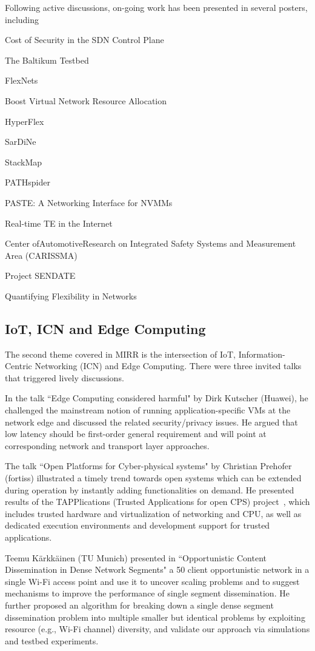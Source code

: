 
Following active discussions, on-going work has been presented in 
several posters, including 

Cost of Security in the SDN Control Plane

The Baltikum Testbed

FlexNets

Boost Virtual Network Resource Allocation

HyperFlex

SarDiNe

StackMap

PATHspider

PASTE: A Networking Interface for NVMMs

Real-time TE in the Internet

Center ofAutomotiveResearch on Integrated Safety Systems
and Measurement Area (CARISSMA)

Project SENDATE

Quantifying Flexibility in Networks


\subsection{IoT, ICN and Edge Computing}

The second theme covered in MIRR is the intersection of IoT, Information-Centric
Networking (ICN) and Edge Computing. There were three invited talks that triggered
lively discussions. 

In the talk ``Edge Computing considered harmful" by Dirk
Kutscher (Huawei), he challenged the mainstream notion of running
application-specific VMs at the network edge and discussed the related
security/privacy issues. He argued that low latency should be first-order
general requirement and will point at corresponding network and
transport layer approaches.

The talk ``Open Platforms for Cyber-physical systems" by Christian Prehofer (fortiss)
illustrated a timely trend towards open systems
which can be extended during operation by instantly adding functionalities on
demand. He presented results of the
TAPPlications (Trusted Applications for open CPS) project~\cite{prehofer:eitec:2016},
which includes trusted hardware and
virtualization of networking and CPU, as well as dedicated execution
environments and development support for trusted applications.

Teemu Kärkkäinen (TU Munich) presented in ``Opportunistic Content
Dissemination in Dense Network Segments" a 50 client opportunistic network in
a single Wi-Fi access point and use it to uncover scaling problems and to suggest
mechanisms to improve the performance of single segment dissemination. He further
proposed an algorithm for breaking down a single dense segment dissemination
problem into multiple smaller but identical problems by exploiting resource 
(e.g., Wi-Fi channel) diversity, and validate our approach via simulations and
testbed experiments.

